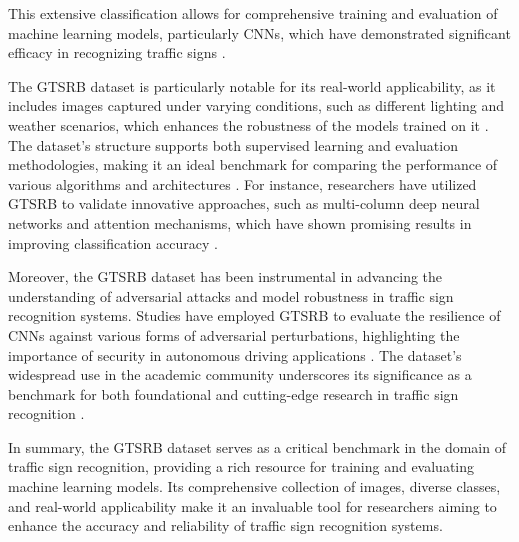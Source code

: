         This extensive classification allows for comprehensive training and evaluation of machine learning models,
         particularly \ac{CNNs}, which have demonstrated significant efficacy in recognizing traffic signs 
         \cite{10.3390/a10040127}.

    The GTSRB dataset is particularly notable for its real-world applicability, as it includes images captured under varying conditions, such as different lighting and weather scenarios, which enhances the robustness of the models trained on it \cite{10.18178/wcse.2019.06.020}. The dataset's structure supports both supervised learning and evaluation methodologies, making it an ideal benchmark for comparing the performance of various algorithms and architectures \cite{10.18280/isi.250211}. For instance, researchers have utilized GTSRB to validate innovative approaches, such as multi-column deep neural networks and attention mechanisms, which have shown promising results in improving classification accuracy \cite{10.1016/j.neunet.2012.02.023,10.1109/icde48307.2020.00079}.
    
    Moreover, the GTSRB dataset has been instrumental in advancing the understanding of adversarial attacks and model robustness in traffic sign recognition systems. Studies have employed GTSRB to evaluate the resilience of CNNs against various forms of adversarial perturbations, highlighting the importance of security in autonomous driving applications \cite{10.1109/aipr50011.2020.9425267,10.48550/arxiv.1911.07399}. The dataset's widespread use in the academic community underscores its significance as a benchmark for both foundational and cutting-edge research in traffic sign recognition \cite{10.1109/cvpr42600.2020.00038}.
    
    In summary, the GTSRB dataset serves as a critical benchmark in the domain of traffic sign recognition, providing a rich resource for training and evaluating machine learning models. Its comprehensive collection of images, diverse classes, and real-world applicability make it an invaluable tool for researchers aiming to enhance the accuracy and reliability of traffic sign recognition systems.
    
    